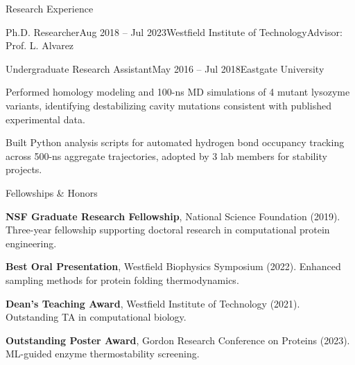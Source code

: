 \documentclass{cv}
\begin{document}
\begin{rSection}{Research Experience}
\begin{rSubsection}{Ph.D. Researcher}{\textcolor{black!60}{Aug 2018 -- Jul 2023}}{Westfield Institute of Technology}{Advisor: Prof. L. Alvarez}
\end{rSubsection}

\begin{rSubsection}{Undergraduate Research Assistant}{\textcolor{black!60}{May 2016 -- Jul 2018}}{Eastgate University}{}

\item Performed homology modeling and 100-ns MD simulations of 4 mutant lysozyme variants, identifying destabilizing cavity mutations consistent with published experimental data.
\item Built Python analysis scripts for automated hydrogen bond occupancy tracking across 500-ns aggregate trajectories, adopted by 3 lab members for stability projects.

\end{rSubsection}

\end{rSection}

\begin{rSection2}{Fellowships \& Honors}
\item \textbf{NSF Graduate Research Fellowship}, National Science Foundation (2019). Three-year fellowship supporting doctoral research in computational protein engineering.
\item \textbf{Best Oral Presentation}, Westfield Biophysics Symposium (2022). Enhanced sampling methods for protein folding thermodynamics.
\item \textbf{Dean's Teaching Award}, Westfield Institute of Technology (2021). Outstanding TA in computational biology.
\item \textbf{Outstanding Poster Award}, Gordon Research Conference on Proteins (2023). ML-guided enzyme thermostability screening.
\end{rSection2}
\end{document}
